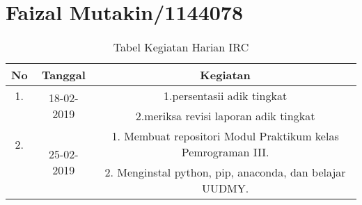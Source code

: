 \chapter{Faizal Mutakin/1144078}
\begin{table}[h]
\caption{Tabel Kegiatan Harian IRC}
\centering
\begin{tabular}{|c|c|c|}
\hline
No&Tanggal&Kegiatan\\
\hline
1.&\multirow{2}{*}{18-02-2019}&1.persentasii adik tingkat\\
&&2.meriksa revisi laporan adik tingkat\\
\hline
2.&\multirow{2}{*}{25-02-2019}&1. Membuat repositori Modul Praktikum kelas Pemrograman III.\\
&&2. Menginstal python, pip, anaconda, dan belajar UUDMY.\\
\hline
\end{tabular}
\label{table:contoh}
\end{table}